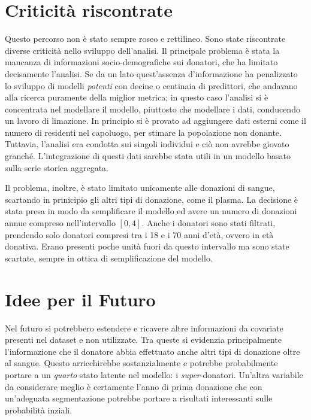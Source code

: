 \documentclass[
  italian,
  a4paper,
  a4paper,
  twoside,
  open=right,
  12pt]{scrbook}
\theoremstyle{definition}
\theoremstyle{remark}
\begin{document}
\section{Criticità riscontrate}\label{criticituxe0-riscontrate}

Questo percorso non è stato sempre roseo e rettilineo. Sono state
riscontrate diverse criticità nello sviluppo dell'analisi. Il principale
problema è stata la mancanza di informazioni socio-demografiche sui
donatori, che ha limitato decisamente l'analisi. Se da un lato
quest'assenza d'informazione ha penalizzato lo sviluppo di modelli
\emph{potenti} con decine o centinaia di predittori, che andavano alla
ricerca puramente della miglior metrica; in questo caso l'analisi si è
concentrata nel modellare il modello, piuttosto che modellare i dati,
conducendo un lavoro di limazione. In principio si è provato ad
aggiungere dati esterni come il numero di residenti nel capoluogo, per
stimare la popolazione non donante. Tuttavia, l'analisi era condotta sui
singoli individui e ciò non avrebbe giovato granché. L'integrazione di
questi dati sarebbe stata utili in un modello basato sulla serie storica
aggregata.

Il problema, inoltre, è stato limitato unicamente alle donazioni di
sangue, scartando in prinicipio gli altri tipi di donazione, come il
plasma. La decisione è stata presa in modo da semplificare il modello ed
avere un numero di donazioni annue compreso nell'intervallo \([0,4]\).
Anche i donatori sono stati filtrati, prendendo solo donatori compresi
tra i 18 e i 70 anni d'età, ovvero in età donativa. Erano presenti poche
unità fuori da questo intervallo ma sono state scartate, sempre in
ottica di semplificazione del modello.

\section{Idee per il Futuro}\label{idee-per-il-futuro}

Nel futuro si potrebbero estendere e ricavere altre informazioni da
covariate presenti nel dataset e non utilizzate. Tra queste si evidenzia
principalmente l'informazione che il donatore abbia effettuato anche
altri tipi di donazione oltre al sangue. Questo arricchirebbe
sostanzialmente e potrebbe probabilmente portare a un \emph{quarto}
stato latente nel modello: i \emph{super}-donatori. Un'altra variabile
da considerare meglio è certamente l'anno di prima donazione che con
un'adeguata segmentazione potrebbe portare a risultati interessanti
sulle probabilità inziali.
\end{document}

